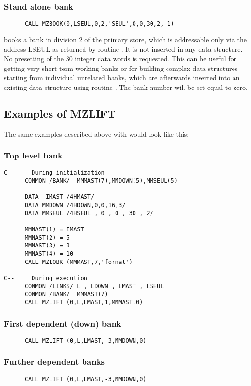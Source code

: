 \subsubsection{Stand alone bank}
\begin{verbatim}
      CALL MZBOOK(0,LSEUL,0,2,'SEUL',0,0,30,2,-1)
\end{verbatim}
books a bank in division 2 of the primary store,
which is addressable only via the address LSEUL as returned by
routine . It is not inserted in any data structure.
No presetting of the 30 integer data words is requested.
This can be useful for getting very short term working banks or for
building complex data structures starting from individual unrelated
banks, which are afterwards inserted into an
existing data structure using routine .
The bank number will be set equal to zero.
\subsection{Examples of MZLIFT}
\par The same examples described above with  would look like this:
\subsubsection{Top level bank}
\begin{verbatim}
C--     During initialization
      COMMON /BANK/  MMMAST(7),MMDOWN(5),MMSEUL(5)
 
      DATA  IMAST /4HMAST/
      DATA MMDOWN /4HDOWN,0,0,16,3/
      DATA MMSEUL /4HSEUL , 0 , 0 , 30 , 2/
 
      MMMAST(1) = IMAST
      MMMAST(2) = 5
      MMMAST(3) = 3
      MMMAST(4) = 10
      CALL MZIOBK (MMMAST,7,'format')
 
C--     During execution
      COMMON /LINKS/ L , LDOWN , LMAST , LSEUL
      COMMON /BANK/  MMMAST(7)
      CALL MZLIFT (0,L,LMAST,1,MMMAST,0)
\end{verbatim}
\subsubsection{First dependent (down) bank}
\par
\begin{verbatim}
      CALL MZLIFT (0,L,LMAST,-3,MMDOWN,0)
\end{verbatim}
\subsubsection{Further dependent banks}
\par
\begin{verbatim}
      CALL MZLIFT (0,L,LMAST,-3,MMDOWN,0)
\end{verbatim}
